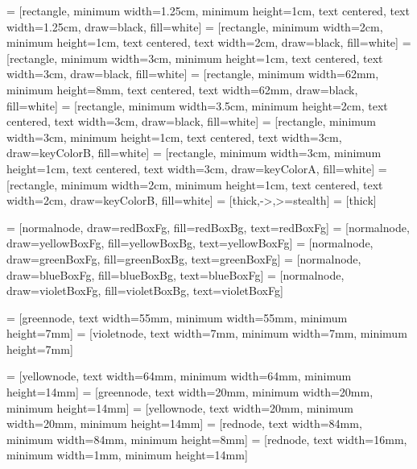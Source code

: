 



 = [rectangle, minimum width=1.25cm, minimum height=1cm, text centered, text width=1.25cm, draw=black, fill=white]
 = [rectangle, minimum width=2cm, minimum height=1cm, text centered, text width=2cm, draw=black, fill=white]
 = [rectangle, minimum width=3cm, minimum height=1cm, text centered, text width=3cm, draw=black, fill=white]
 = [rectangle, minimum width=62mm, minimum height=8mm, text centered, text width=62mm, draw=black, fill=white]
 = [rectangle, minimum width=3.5cm, minimum height=2cm, text centered, text width=3cm, draw=black, fill=white]
 = [rectangle, minimum width=3cm, minimum height=1cm, text centered, text width=3cm, draw=keyColorB, fill=white]
 = [rectangle, minimum width=3cm, minimum height=1cm, text centered, text width=3cm, draw=keyColorA, fill=white]
 = [rectangle, minimum width=2cm, minimum height=1cm, text centered, text width=2cm, draw=keyColorB, fill=white]
 = [thick,->,>=stealth]
 = [thick]

 = [normalnode, draw=redBoxFg, fill=redBoxBg, text=redBoxFg]
 = [normalnode, draw=yellowBoxFg, fill=yellowBoxBg, text=yellowBoxFg]
 = [normalnode, draw=greenBoxFg, fill=greenBoxBg, text=greenBoxFg]
 = [normalnode, draw=blueBoxFg, fill=blueBoxBg, text=blueBoxFg]
 = [normalnode, draw=violetBoxFg, fill=violetBoxBg, text=violetBoxFg]

 = [greennode, text width=55mm, minimum width=55mm, minimum height=7mm]
 = [violetnode, text width=7mm, minimum width=7mm, minimum height=7mm]

 = [yellownode, text width=64mm, minimum width=64mm, minimum height=14mm]
 = [greennode, text width=20mm, minimum width=20mm, minimum height=14mm]
 = [yellownode, text width=20mm, minimum width=20mm, minimum height=14mm]
 = [rednode, text width=84mm, minimum width=84mm, minimum height=8mm]
 = [rednode, text width=16mm, minimum width=1mm, minimum height=14mm]
\newcommand{\consumerBox}[1]{{\color{greenBoxFg}\colorbox{greenBoxBg}{#1}}}
\newcommand{\producerBox}[1]{{\color{yellowBoxFg}\colorbox{yellowBoxBg}{#1}}}

